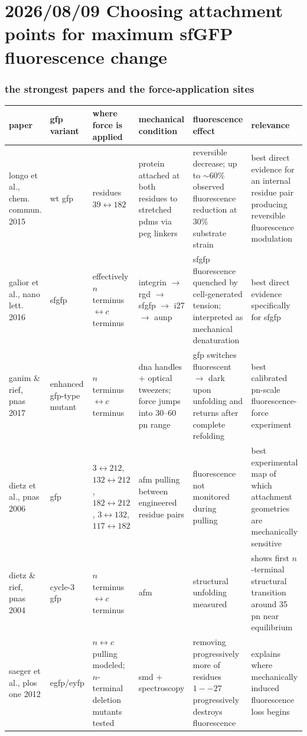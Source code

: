 \documentclass{article}
\begin{document}
\section{2026/08/09 Choosing attachment points for maximum sfGFP fluorescence change}
\subsubsection*{the strongest papers and the force-application sites}

\begin{table}[h]\noindent\begin{tabularx}{\linewidth}{llllll}
\hline
paper & gfp variant & where force is applied & mechanical condition & fluorescence effect & relevance \\ \hline
longo et al., chem. commun. 2015 & wt gfp & residues \(39 \leftrightarrow 182\) & protein attached at both residues to stretched pdms via peg linkers & reversible decrease; up to \(\sim 60\%\) observed fluorescence reduction at 30\% substrate strain & best direct evidence for an internal residue pair producing reversible fluorescence modulation \\ \hline
galior et al., nano lett. 2016 & sfgfp & effectively \(n\) terminus \(\leftrightarrow c\) terminus & integrin \(\rightarrow\) rgd \(\rightarrow\) sfgfp \(\rightarrow\) i27 \(\rightarrow\) aunp & sfgfp fluorescence quenched by cell-generated tension; interpreted as mechanical denaturation & best direct evidence specifically for sfgfp \\ \hline
ganim \& rief, pnas 2017 & enhanced gfp-type mutant & \(n\) terminus \(\leftrightarrow c\) terminus & dna handles + optical tweezers; force jumps into 30--60 pn range & gfp switches fluorescent \(\rightarrow\) dark upon unfolding and returns after complete refolding & best calibrated pn-scale fluorescence-force experiment \\ \hline
dietz et al., pnas 2006 & gfp & \(3 \leftrightarrow 212\), \(132 \leftrightarrow 212\), \(182 \leftrightarrow 212\), \(3 \leftrightarrow 132\), \(117 \leftrightarrow 182\) & afm pulling between engineered residue pairs & fluorescence not monitored during pulling & best experimental map of which attachment geometries are mechanically sensitive \\ \hline
dietz \& rief, pnas 2004 & cycle-3 gfp & \(n\) terminus \(\leftrightarrow c\) terminus & afm & structural unfolding measured & shows first \(n\)-terminal structural transition around 35 pn near equilibrium \\ \hline
saeger et al., plos one 2012 & egfp/eyfp & \(n \leftrightarrow c\) pulling modeled; \(n\)-terminal deletion mutants tested & smd + spectroscopy & removing progressively more of residues \(1--27\) progressively destroys fluorescence & explains where mechanically induced fluorescence loss begins \\ \hline
\end{tabularx}\end{table}
\end{document}
